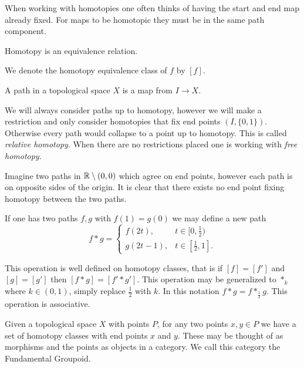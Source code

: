 \documentclass[11pt,leqno,oneside]{amsart}
\numberwithin{thm}{section}
\begin{document}
When working with homotopies one often thinks of having the start and
end map already fixed. For maps to be homotopic they must be in the
same path component.

\begin{prop}
  Homotopy is an equivalence relation.
\end{prop}

We denote the homotopy equivalence class of \(f\) by \([f]\).

\begin{defn}
  A path in a topological space \(X\) is a map from \(I \to X\).
\end{defn}

We will always consider paths up to homotopy, however we will make a
restriction and only consider homotopies that fix end
points \((I,\{0,1\})\). Otherwise every path would collapse to a point up to
homotopy. This is called \emph{relative homotopy}. When there are no
restrictions placed one is working with \emph{free homotopy}.

Imagine two paths in \({\mathbb R} \setminus (0,0)\) which agree on end points,
however each path is on opposite sides of the origin. It is clear that
there exists no end point fixing homotopy between the two paths.

If one has two paths \(f,g\) with \(f(1)=g(0)\) we may define a new
path
\[f * g =
  \begin{cases}
    f(2t), & t \in [0,\frac{1}{2})\\
    g(2t - 1), & t \in [\frac{1}{2},1].
  \end{cases}
\]

This operation is well defined on homotopy classes, that is if
\([f]=[f']\) and \([g]=[g']\) then \([f * g] = [f' * g']\). This
operation may be generalized to \(*_{k}\) where \(k \in (0,1)\),
simply replace \(\frac{1}{2}\) with \(k\). In this notation \(f * g =
f *_{\frac{1}{2}} g\). This operation is associative.

Given a topological space \(X\) with points \(P\), for any two points
\(x,y \in P\) we have a set of homotopy classes with end points \(x\)
and \(y\). These may be thought of as morphisms and the points as
objects in a category. We call this category the Fundamental Groupoid.
\end{document}
